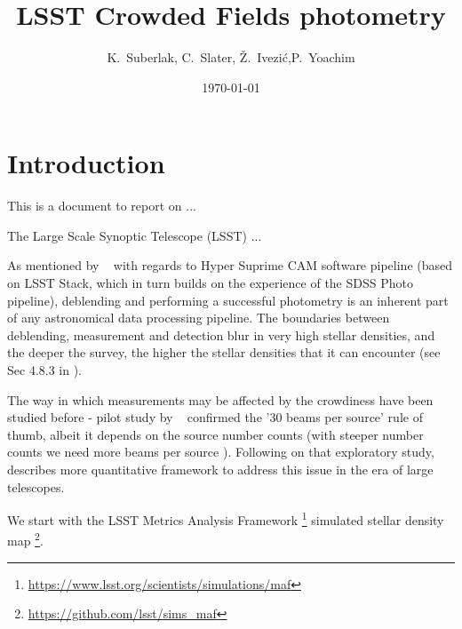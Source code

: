 \documentclass[DM,lsstdraft,toc,usenatbib]{lsstdoc}
\title[Crowded fields ]{LSST  Crowded Fields photometry}
\author{
K.~Suberlak, C.~Slater,
\v{Z}.~Ivezi\'c,P.~Yoachim}
\date{\today}
\begin{document}
\maketitle

\section{Introduction}

This is a document to report on ... 

The Large Scale Synoptic Telescope (LSST) ... 

As mentioned by ~\cite{bosch2017} with regards to Hyper Suprime CAM software pipeline (based on LSST Stack, which in turn builds on the experience of the SDSS  Photo pipeline), deblending and performing a successful photometry is an inherent part of any astronomical data processing pipeline. The boundaries between deblending, measurement and detection blur in very high stellar densities, and the deeper the survey, the higher the stellar densities that it can encounter (see Sec 4.8.3 in \cite{bosch2017}). 

The way in which measurements may be affected by the crowdiness have been studied before - pilot study by ~\citep{hogg2001} confirmed the '30 beams per source' rule of thumb, albeit it depends on the source number counts (with steeper number counts we need more beams per source ). Following on that exploratory study,  ~\cite{olsen2003} describes more quantitative framework to address this issue in the era of large telescopes. 

We start with the LSST  Metrics Analysis Framework \footnote{\url{https://www.lsst.org/scientists/simulations/maf}} simulated stellar density map \footnote{\url{https://github.com/lsst/sims_maf}}. 





\end{document}
